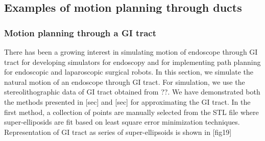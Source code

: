 \documentclass[12pt,a4]{article}
\begin{document}
\subsection{Examples of motion planning through ducts}
\subsubsection{Motion planning through a GI tract}
There has been a growing interest in simulating motion of endoscope through GI tract for developing simulators for endoscopy and for implementing path planning for endoscopic and laparoscopic surgical robots. In this section, we simulate the natural motion of an endoscope through GI tract. For simulation, we use the stereolithographic data of GI tract obtained from ??. We have demonstrated both the methods presented in [sec] and [sec] for approximating the GI tract. In the first method, a collection of points are manually selected from the STL file where super-elliposids are fit based on least square error minimization techniques. Representation of GI tract as series of super-ellipsoids is shown in [fig19]
\end{document}
